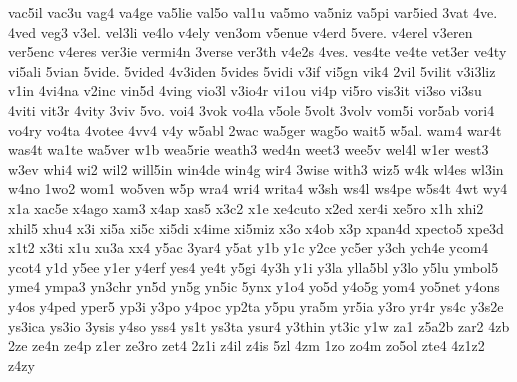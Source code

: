 {vac5il
vac3u
vag4
va4ge
va5lie
val5o
val1u
va5mo
va5niz
va5pi
var5ied
3vat
4ve.
4ved
veg3
v3el.
vel3li
ve4lo
v4ely
ven3om
v5enue
v4erd
5vere.
v4erel
v3eren
ver5enc
v4eres
ver3ie
vermi4n
3verse
ver3th
v4e2s
4ves.
ves4te
ve4te
vet3er
ve4ty
vi5ali
5vian
5vide.
5vided
4v3iden
5vides
5vidi
v3if
vi5gn
vik4
2vil
5vilit
v3i3liz
v1in
4vi4na
v2inc
vin5d
4ving
vio3l
v3io4r
vi1ou
vi4p
vi5ro
vis3it
vi3so
vi3su
4viti
vit3r
4vity
3viv
5vo.
voi4
3vok
vo4la
v5ole
5volt
3volv
vom5i
vor5ab
vori4
vo4ry
vo4ta
4votee
4vv4
v4y
w5abl
2wac
wa5ger
wag5o
wait5
w5al.
wam4
war4t
was4t
wa1te
wa5ver
w1b
wea5rie
weath3
wed4n
weet3
wee5v
wel4l
w1er
west3
w3ev
whi4
wi2
wil2
will5in
win4de
win4g
wir4
3wise
with3
wiz5
w4k
wl4es
wl3in
w4no
1wo2
wom1
wo5ven
w5p
wra4
wri4
writa4
w3sh
ws4l
ws4pe
w5s4t
4wt
wy4
x1a
xac5e
x4ago
xam3
x4ap
xas5
x3c2
x1e
xe4cuto
x2ed
xer4i
xe5ro
x1h
xhi2
xhil5
xhu4
x3i
xi5a
xi5c
xi5di
x4ime
xi5miz
x3o
x4ob
x3p
xpan4d
xpecto5
xpe3d
x1t2
x3ti
x1u
xu3a
xx4
y5ac
3yar4
y5at
y1b
y1c
y2ce
yc5er
y3ch
ych4e
ycom4
ycot4
y1d
y5ee
y1er
y4erf
yes4
ye4t
y5gi
4y3h
y1i
y3la
ylla5bl
y3lo
y5lu
ymbol5
yme4
ympa3
yn3chr
yn5d
yn5g
yn5ic
5ynx
y1o4
yo5d
y4o5g
yom4
yo5net
y4ons
y4os
y4ped
yper5
yp3i
y3po
y4poc
yp2ta
y5pu
yra5m
yr5ia
y3ro
yr4r
ys4c
y3s2e
ys3ica
ys3io
3ysis
y4so
yss4
ys1t
ys3ta
ysur4
y3thin
yt3ic
y1w
za1
z5a2b
zar2
4zb
2ze
ze4n
ze4p
z1er
ze3ro
zet4
2z1i
z4il
z4is
5zl
4zm
1zo
zo4m
zo5ol
zte4
4z1z2
z4zy
}
